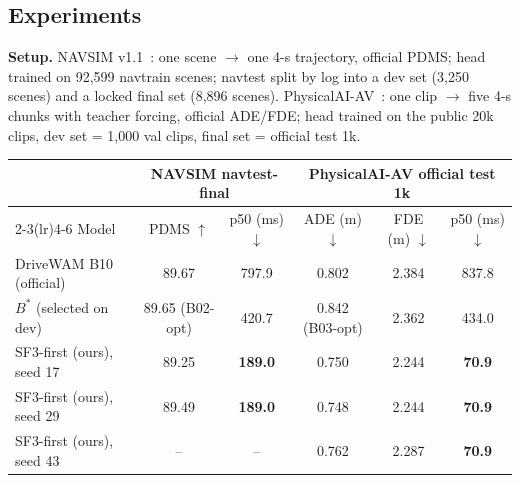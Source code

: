 \documentclass[nouppercase]{kaia}
\begin{document}
\begin{mdframed}
\subsection{Experiments}
\textbf{Setup.} NAVSIM v1.1~\cite{dauner2024navsim}: one scene $\rightarrow$ one 4-s trajectory, official PDMS; head trained on 92,599 navtrain scenes; navtest split by log into a dev set (3,250 scenes) and a locked final set (8,896 scenes). PhysicalAI-AV~\cite{nvidia2025physicalai}: one clip $\rightarrow$ five 4-s chunks with teacher forcing, official ADE/FDE; head trained on the public 20k clips, dev set = 1,000 val clips, final set = official test 1k.

\begin{center}
\small
\setlength{\tabcolsep}{5pt}
\begin{tabular}{lcc@{\hskip 14pt}ccc}
\toprule
 & \multicolumn{2}{c}{NAVSIM navtest-final} & \multicolumn{3}{c}{PhysicalAI-AV official test 1k} \\
\cmidrule(lr){2-3}\cmidrule(lr){4-6}
Model & PDMS $\uparrow$ & p50 (ms) $\downarrow$ & ADE (m) $\downarrow$ & FDE (m) $\downarrow$ & p50 (ms) $\downarrow$ \\
\midrule
DriveWAM B10 (official)      & 89.67 & 797.9 & 0.802 & 2.384 & 837.8 \\
$B^{*}$ (selected on dev) & 89.65 (B02-opt) & 420.7 & 0.842 (B03-opt) & 2.362 & 434.0 \\
SF3-first (ours), seed 17 & 89.25 & \textbf{189.0} & 0.750 & 2.244 & \textbf{70.9} \\
SF3-first (ours), seed 29 & 89.49 & \textbf{189.0} & 0.748 & 2.244 & \textbf{70.9} \\
SF3-first (ours), seed 43 & --    & --    & 0.762 & 2.287 & \textbf{70.9} \\
\bottomrule
\end{tabular}
\label{tab:final}
\end{center}


\end{mdframed}
\end{document}
